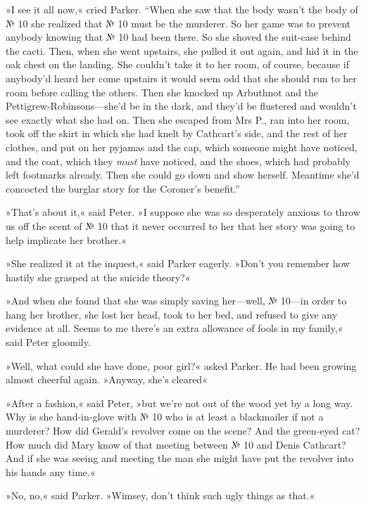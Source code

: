 »I see it all now,« cried Parker. \enquote{When she saw that the body wasn't the body of № 10 she realized that № 10 must be the murderer. So her game was to prevent anybody knowing that № 10 had been there.  So she shoved the suit-case behind the cacti. Then, when she went upstairs, she pulled it out again, and hid it in the oak chest on the landing. She couldn't take it to her room, of course, because if anybody'd heard her come upstairs it would seem odd that she should run to her room before calling the others. Then she knocked up Arbuthnot and the Pettigrew-Robinsons\allowbreak---\allowbreak she'd be in the dark, and they'd be flustered and wouldn't see exactly what she had on. Then she escaped from Mrs P., ran into her room, took off the skirt in which she had knelt by Cathcart's side, and the rest of her clothes, and put on her pyjamas and the cap, which someone might have noticed, and the coat, which they \textit{must} have noticed, and the shoes, which had probably left footmarks already. Then she could go down and show herself. Meantime she'd concocted the burglar story for the Coroner's benefit.}

»That's about it,« said Peter. »I suppose she was so desperately anxious to throw us off the scent of № 10 that it never occurred to her that her story was going to help implicate her brother.«

»She realized it at the inquest,« said Parker eagerly. »Don't you remember how hastily she grasped at the suicide theory?«

»And when she found that she was simply saving her\allowbreak---\allowbreak well, № 10\allowbreak---\allowbreak in order to hang her brother, she lost her head, took to her bed, and refused to give any evidence at all. Seems to me there's an extra allowance of fools in my family,« said Peter gloomily.

»Well, what could she have done, poor girl?« asked Parker. He had been growing almost cheerful again. »Anyway, she's cleared\longdash«

»After a fashion,« said Peter, »but we're not out of the wood yet by a long way. Why is she hand-in-glove with № 10 who is at least a blackmailer if not a murderer? How did Gerald's revolver come on the scene? And the green-eyed cat? How much did Mary know of that meeting between № 10 and Denis Cathcart? And if she was seeing and meeting the man she might have put the revolver into his hands any time.«

»No, no,« said Parker. »Wimsey, don't think such ugly things as that.«

